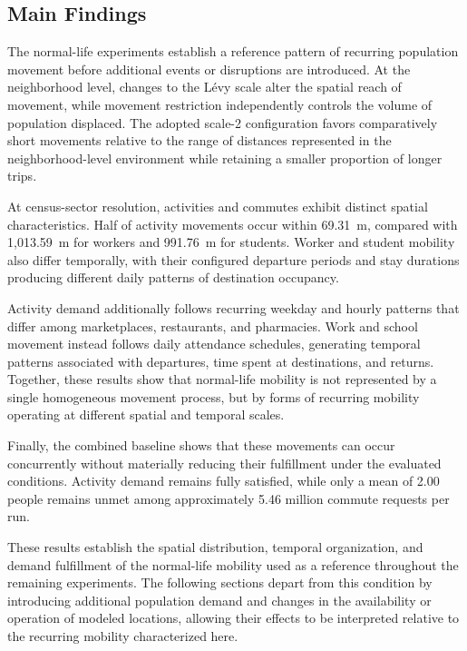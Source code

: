 \subsection{Main Findings}
\label{sec:routine_mobility_findings}

The normal-life experiments establish a reference pattern of recurring population movement before additional events or disruptions are introduced. At the neighborhood level, changes to the Lévy scale alter the spatial reach of movement, while movement restriction independently controls the volume of population displaced. The adopted scale-2 configuration favors comparatively short movements relative to the range of distances represented in the neighborhood-level environment while retaining a smaller proportion of longer trips.

At census-sector resolution, activities and commutes exhibit distinct spatial characteristics. Half of activity movements occur within 69.31~m, compared with 1,013.59~m for workers and 991.76~m for students. Worker and student mobility also differ temporally, with their configured departure periods and stay durations producing different daily patterns of destination occupancy.

Activity demand additionally follows recurring weekday and hourly patterns that differ among marketplaces, restaurants, and pharmacies. Work and school movement instead follows daily attendance schedules, generating temporal patterns associated with departures, time spent at destinations, and returns. Together, these results show that normal-life mobility is not represented by a single homogeneous movement process, but by forms of recurring mobility operating at different spatial and temporal scales.

Finally, the combined baseline shows that these movements can occur concurrently without materially reducing their fulfillment under the evaluated conditions. Activity demand remains fully satisfied, while only a mean of 2.00 people remains unmet among approximately 5.46 million commute requests per run.

These results establish the spatial distribution, temporal organization, and demand fulfillment of the normal-life mobility used as a reference throughout the remaining experiments. The following sections depart from this condition by introducing additional population demand and changes in the availability or operation of modeled locations, allowing their effects to be interpreted relative to the recurring mobility characterized here.

